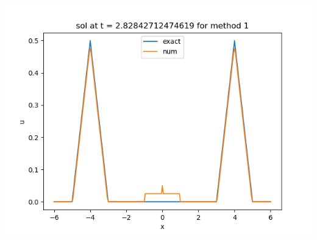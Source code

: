\documentclass{article}
\begin{document}
\begin{enumerate}[label=(\alph*)]
\begin{center}
	\includegraphics[scale=.4]{hw11 sol n = 80 method 1}
\end{center}


\end{enumerate}
\end{document}
